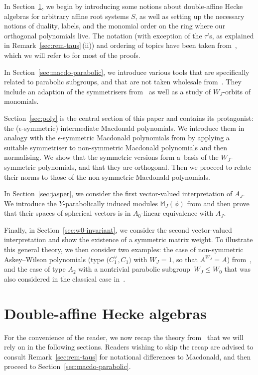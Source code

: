 \documentclass[10pt,a4paper]{amsart}
\theoremstyle{definition}
\numberwithin{equation}{section}
\begin{document}
In Section~\ref{sec:daha-general}, we begin by introducing some notions about double-affine Hecke algebras for arbitrary
affine root systems $S$, as well as setting up the necessary notions of duality, labels, and
the monomial order on the ring where our orthogonal polynomials live. The notation (with
exception of the $\tau$'s, as explained in Remark~\ref{sec:rem-taus}\,(ii)) and
ordering of topics have been taken from~\cite{macdonald}, which we will refer to for most of the proofs.

In Section~\ref{sec:macdo-parabolic}, we introduce various tools that are specifically related to parabolic subgroups,
and that are not taken wholesale from~\cite{macdonald}. They include an adaption of the symmetrisers from~\cite[Section~5.5]{macdonald} as well as a study of $W_J$-orbits of monomials.

Section~\ref{sec:poly} is the central section of this paper and contains its protagonist: the ($\epsilon$-symmetric) intermediate
Macdonald polynomials. We introduce them in analogy with the $\epsilon$-symmetric Macdonald polynomials
from \cite[Section~5.7]{macdonald} by applying a suitable symmetriser to non-symmetric Macdonald polynomials
and then normalising. We show that the symmetric versions form a~basis of the $W_J$-symmetric polynomials,
and that they are orthogonal. Then we proceed to relate their norms to those of the non-symmetric
Macdonald polynomials.

In Section~\ref{sec:jasper}, we consider the first
vector-valued interpretation of $A_J$. We introduce the $Y$-parabolically
induced modules $\mathbb{M}_J(\phi)$ from \cite[Section~3.2]{stokmanInduced} and then prove that their spaces of spherical vectors
is in $A_0$-linear equivalence with $A_J$.

Finally, in Section~\ref{sec:w0-invariant}, we consider the second vector-valued interpretation
and show the existence of a symmetric matrix weight.
To illustrate this general theory, we then consider two examples: the case
of non-symmetric Askey--Wilson polynomials
\big(type $\bigl(C_1^\vee, C_1\bigr)$ with $W_J=1$, so that $A^{W_J}=A$\big) from~\cite{koornwinderBouzeffour}, and the case
of type $A_2$ with a nontrivial parabolic subgroup~${W_J\le W_0}$ that was also considered in the classical case
in~\cite{mvpVectorValued}.

\section{Double-affine Hecke algebras}\label{sec:daha-general}
For the convenience of the reader, we now recap the theory from~\cite{macdonald} that we will rely on in
the following sections. Readers wishing to skip the recap are advised to consult Remark~\ref{sec:rem-taus}
for notational differences to Macdonald, and then proceed to Section~\ref{sec:macdo-parabolic}.
\end{document}
